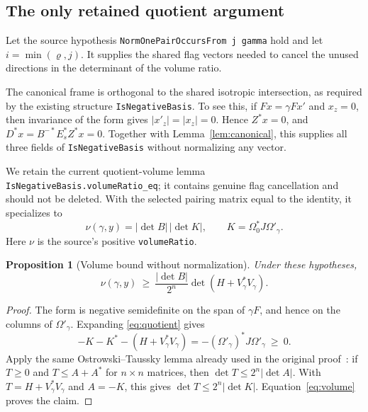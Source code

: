 \documentclass[11pt,letterpaper]{article}
\newtheorem{proposition}[theorem]{Proposition}
\theoremstyle{remark}
\newcommand{\abs}[1]{\left|#1\right|}
\newcommand{\code}[1]{{\small\urlstyle{tt}\nolinkurl{#1}}}
\begin{document}
\subsection{The only retained quotient argument}

Let the source hypothesis \code{NormOnePairOccursFrom j gamma} hold and let
$i=\min(\varrho,j)$. It supplies the shared flag vectors needed to cancel the
unused directions in the determinant of the volume ratio.

The canonical frame is orthogonal to the shared isotropic intersection, as
required by the existing structure \code{IsNegativeBasis}. To see this, if
$Fx=\gamma Fx'$ and $x_z=0$, then invariance of the form gives
$\abs{x'_z}=\abs{x_z}=0$. Hence $Z^*x=0$, and
$D^*x=B^{-*}E_s^*Z^*x=0$.
Together with Lemma~\ref{lem:canonical}, this supplies all three fields of
\code{IsNegativeBasis} without normalizing any vector.

We retain the current quotient-volume lemma
\code{IsNegativeBasis.volumeRatio_eq}; it contains genuine flag cancellation
and should not be deleted. With the selected pairing matrix equal to the
identity, it specializes to
\begin{equation}\label{eq:volume}
 \nu(\gamma,y)=\abs{\det B}\,\abs{\det K},
 \qquad K=\Omega_0^*J\Omega'_\gamma.
\end{equation}
Here $\nu$ is the source's positive \code{volumeRatio}.

\begin{proposition}[Volume bound without normalization]\label{prop:volume}
Under these hypotheses,
\begin{equation}\label{eq:lower}
 \nu(\gamma,y)\ \geq\
 \frac{\abs{\det B}}{2^n}\det(H+V_\gamma^*V_\gamma).
\end{equation}
\end{proposition}

\begin{proof}
The form is negative semidefinite on the span of $\gamma F$, and hence on the
columns of $\Omega'_\gamma$. Expanding \eqref{eq:quotient} gives
\[
 -K-K^*-(H+V_\gamma^*V_\gamma)
 =-(\Omega'_\gamma)^*J\Omega'_\gamma\ \geq\ 0.
\]
Apply the same Ostrowski--Taussky lemma already used in the original proof~\cite{gaussian}:
if $T\geq0$ and $T\leq A+A^*$ for $n\times n$ matrices, then
$\det T\leq2^n\abs{\det A}$. With $T=H+V_\gamma^*V_\gamma$ and $A=-K$, this
gives $\det T\leq2^n\abs{\det K}$. Equation~\eqref{eq:volume} proves the claim.
\end{proof}
\end{document}
